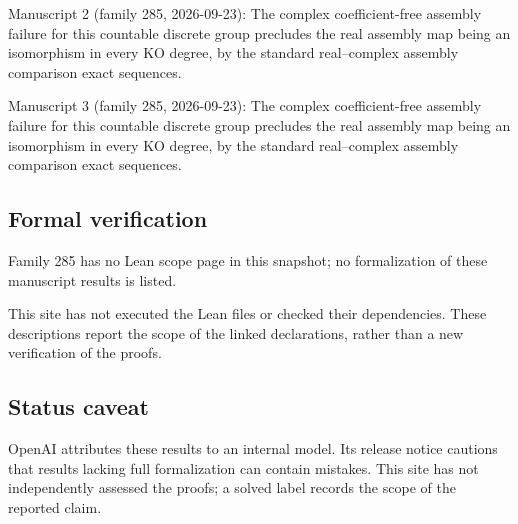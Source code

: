 \documentclass[11pt]{article}
\begin{document}
Manuscript 2 (family 285, 2026-09-23): The complex coefficient-free assembly failure for this countable discrete group precludes the real assembly map being an isomorphism in every KO degree, by the standard real–complex assembly comparison exact sequences.

Manuscript 3 (family 285, 2026-09-23): The complex coefficient-free assembly failure for this countable discrete group precludes the real assembly map being an isomorphism in every KO degree, by the standard real–complex assembly comparison exact sequences.

\subsection{Formal verification}
Family 285 has no Lean scope page in this snapshot; no formalization of these manuscript results is listed.

This site has not executed the Lean files or checked their dependencies. These descriptions report the scope of the linked declarations, rather than a new verification of the proofs.

\subsection{Status caveat}
OpenAI attributes these results to an internal model. Its release notice cautions that results lacking full formalization can contain mistakes. This site has not independently assessed the proofs; a solved label records the scope of the reported claim.
\end{document}
